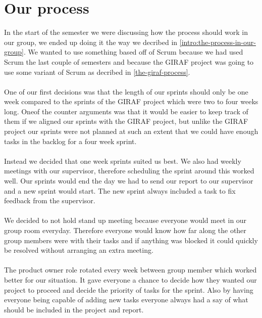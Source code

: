 \section{Our process}
In the start of the semester we were discussing how the process should work in our group, we ended up doing it the way we decribed in \autoref{intro:the-process-in-our-group}.
We wanted to use something based off of Scrum because we had used Scrum the last couple of semesters and because the GIRAF project was going to use some variant of Scrum as decribed in \autoref{the-giraf-process}.
\\\\
One of our first decisions was that the length of our sprints should only be one week compared to the sprints of the GIRAF project which were two to four weeks long.
Oneof the counter arguments was that it would be easier to keep track of them if we aligned our sprints with the GIRAF project, but unlike the GIRAF project our sprints were not planned at such an extent that we could have enough tasks in the backlog for a four week sprint.
\\\\
Instead we decided that one week sprints suited us best.
We also had weekly meetings with our supervisor, therefore scheduling the sprint around this worked well.
Our sprints would end the day we had to send our report to our supervisor and a new sprint would start. The new sprint always included a task to fix feedback from the supervisor.
\\\\
We decided to not hold stand up meeting because everyone would meet in our group room everyday.
Therefore everyone would know how far along the other group members were with their tasks and if anything was blocked it could quickly be resolved without arranging an extra meeting.
\\\\
The product owner role rotated every week between group member which worked better for our situation. 
It gave everyone a chance to decide how they wanted our project to proceed and decide the priority of tasks for the sprint.
Also by having everyone being capable of adding new tasks everyone always had a say of what should be included in the project and report.
